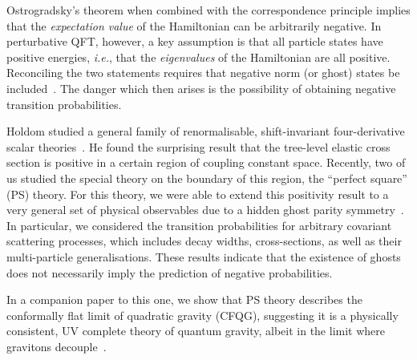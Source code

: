 \documentclass[a4paper,11pt]{article}
\begin{document}
Ostrogradsky's theorem when combined with the correspondence principle implies that the {\it expectation value} of the Hamiltonian can be arbitrarily negative. In perturbative QFT, however, a key assumption is that all particle states have positive energies, {\it i.e.}, that the {\it eigenvalues} of the Hamiltonian are all positive. Reconciling the two statements requires that negative norm (or ghost) states be included~\cite{Bateman:2026letter}. The danger which then arises is the possibility of obtaining negative transition probabilities.

Holdom studied a general family of renormalisable, shift-invariant four-derivative scalar theories~\cite{Holdom:2023usn,Holdom:2024cfq}.  He found the surprising result that the tree-level elastic cross section is positive in a certain region of coupling constant space. Recently, two of us studied the special theory on the boundary of this region, the ``perfect square'' (PS) theory. For this theory, we were able to extend this positivity result to a very general set of physical observables due to a hidden ghost parity symmetry~\cite{Bateman:2026letter}. In particular, we considered the transition probabilities for arbitrary covariant scattering processes, which includes decay widths, cross-sections, as well as their multi-particle generalisations. These results indicate that the existence of ghosts does not necessarily imply the prediction of negative probabilities.

In a companion paper to this one, we show that PS theory describes the conformally flat limit of quadratic gravity (CFQG), suggesting it is a physically consistent, UV complete theory of quantum gravity, albeit in the limit where gravitons decouple~\cite{Anderson:2026Rsqaured}. 
\end{document}
